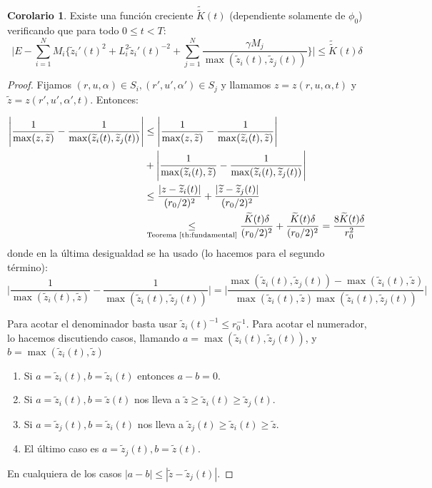 \documentclass[a4paper,10pt]{scrartcl}
\theoremstyle{definition}
\newtheorem{corollary}{Corolario}
\newcommand{\ktilde}{\widetilde{K}}
\newcommand{\dtilde}[1]{\widetilde{\widetilde{#1}}}
\numberwithin{equation}{section}
\begin{document}
\begin{corollary}
 Existe una función creciente $\dtilde{K}(t)$ (dependiente solamente de $\phi_0$) verificando que para todo $0 \le t < T$:
 \[
  \Bigg|E - \sum_{i=1}^N M_i\bigg\{\widetilde{z}_i'(t)^2 + L_i^2\widetilde{z}_i'(t)^{-2} + \sum_{j=1}^N \frac{\gamma M_j}{\max(\widetilde{z}_i(t), \widetilde{z}_j(t))}\bigg\} \Bigg| \le \dtilde{K}(t) \delta
 \]
\end{corollary}
\begin{proof}
 Fijamos $(r,u,\alpha) \in S_i, (r',u',\alpha') \in S_j$ y llamamos $z = z(r,u,\alpha,t)$ y $\widetilde{z} = z(r',u',\alpha',t)$. Entonces:
 
 \begin{align*}
 \Bigg|\frac{1}{\max(z,\widetilde{z})} - \frac{1}{\max(\widetilde{z}_i(t), \widetilde{z}_j(t))} \Bigg| &\le \Bigg|\frac{1}{\max(z,\widetilde{z})} - \frac{1}{\max(\widetilde{z}_i(t),\widetilde{z})} \Bigg|\\
 &+ \Bigg|\frac{1}{\max(\widetilde{z}_i(t),\widetilde{z})} - \frac{1}{\max(\widetilde{z}_i(t), \widetilde{z}_j(t))}\Bigg|\\
 &\le \frac{|z-\widetilde{z}_i(t)|}{(r_0/2)^2} + \frac{|\widetilde{z}-\widetilde{z}_j(t)|}{(r_0/2)^2}\\
 &\underset{\textrm{Teorema \ref{th:fundamental}}}{\le} \frac{\ktilde(t)\delta}{(r_0/2)^2} + \frac{\ktilde(t)\delta}{(r_0/2)^2} = \frac{8\ktilde(t)\delta}{r_0^2}
 \end{align*}
donde en la última desigualdad se ha usado (lo hacemos para el segundo término):
\[
  \Bigg|\frac{1}{\max(\widetilde{z}_i(t),\widetilde{z})} - \frac{1}{\max(\widetilde{z}_i(t), \widetilde{z}_j(t))}\Bigg| = \Bigg|\frac{\max(\widetilde{z}_i(t), \widetilde{z}_j(t)) - \max(\widetilde{z}_i(t), \widetilde{z})}{\max(\widetilde{z}_i(t),\widetilde{z}) \max(\widetilde{z}_i(t), \widetilde{z}_j(t))} \Bigg|
\]

Para acotar el denominador basta usar $\widetilde{z}_i(t)^{-1} \le r_0^{-1}$. Para acotar el numerador, lo hacemos discutiendo casos, llamando $a = \max(\widetilde{z}_i(t), \widetilde{z}_j(t))$, y $b= \max(\widetilde{z}_i(t), \widetilde{z})$ 

\begin{enumerate}
 \item Si $a= \widetilde{z}_i(t), b=\widetilde{z}_i(t)$ entonces $a-b = 0$.
 \item Si $a = \widetilde{z}_i(t), b = \widetilde{z}(t)$ nos lleva a $\widetilde{z} \ge \widetilde{z}_i(t)\ge \widetilde{z}_j(t)$.
 \item Si $a = \widetilde{z}_j(t), b = \widetilde{z}_i(t)$ nos lleva a $\widetilde{z}_j(t) \ge \widetilde{z}_i(t) \ge \widetilde{z}$.
 \item El último caso es $a = \widetilde{z}_j(t), b = \widetilde{z}(t)$.
\end{enumerate}
En cualquiera de los casos $|a-b| \le |\widetilde{z} - \widetilde{z}_j(t)|$.


\end{proof}
\end{document}
